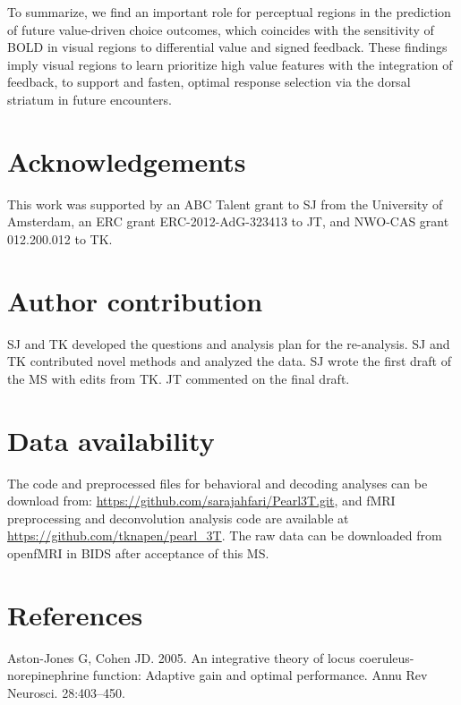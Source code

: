\documentclass[]{article}
\begin{document}
To summarize, we find an important role for perceptual regions in the
prediction of future value-driven choice outcomes, which coincides with
the sensitivity of BOLD in visual regions to differential value and
signed feedback. These findings imply visual regions to learn prioritize
high value features with the integration of feedback, to support and
fasten, optimal response selection via the dorsal striatum in future
encounters.

\hypertarget{acknowledgements}{%
\section{Acknowledgements}\label{acknowledgements}}

This work was supported by an ABC Talent grant to SJ from the University
of Amsterdam, an ERC grant ERC-2012-AdG-323413 to JT, and NWO-CAS grant
012.200.012 to TK.

\hypertarget{author-contribution}{%
\section{Author contribution}\label{author-contribution}}

SJ and TK developed the questions and analysis plan for the re-analysis.
SJ and TK contributed novel methods and analyzed the data. SJ wrote the
first draft of the MS with edits from TK. JT commented on the final
draft.

\hypertarget{data-availability}{%
\section{Data availability}\label{data-availability}}

The code and preprocessed files for behavioral and decoding analyses can
be download from: \url{https://github.com/sarajahfari/Pearl3T.git}, and
fMRI preprocessing and deconvolution analysis code are available at
\url{https://github.com/tknapen/pearl_3T}. The raw data can be
downloaded from openfMRI in BIDS after acceptance of this MS.

\hypertarget{references}{%
\section*{References}\label{references}}

\hypertarget{refs}{}
\leavevmode\hypertarget{ref-Astonetal2005}{}%
Aston-Jones G, Cohen JD. 2005. An integrative theory of locus
coeruleus-norepinephrine function: Adaptive gain and optimal
performance. Annu Rev Neurosci. 28:403--450.
\end{document}
